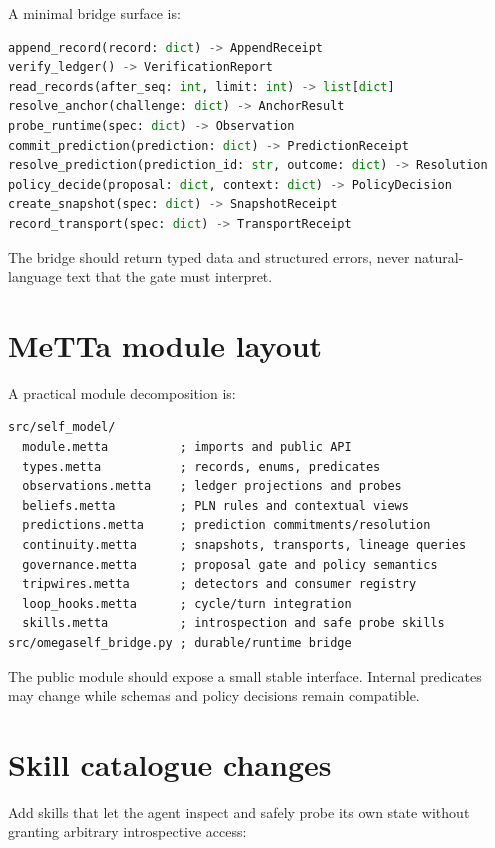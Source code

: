 \documentclass[11pt,oneside]{report}
\begin{document}
A minimal bridge surface is:

\begin{lstlisting}[language=Python,caption={Reference bridge interface}]
append_record(record: dict) -> AppendReceipt
verify_ledger() -> VerificationReport
read_records(after_seq: int, limit: int) -> list[dict]
resolve_anchor(challenge: dict) -> AnchorResult
probe_runtime(spec: dict) -> Observation
commit_prediction(prediction: dict) -> PredictionReceipt
resolve_prediction(prediction_id: str, outcome: dict) -> Resolution
policy_decide(proposal: dict, context: dict) -> PolicyDecision
create_snapshot(spec: dict) -> SnapshotReceipt
record_transport(spec: dict) -> TransportReceipt
\end{lstlisting}

The bridge should return typed data and structured errors, never natural-language text that the gate must interpret.

\section{MeTTa module layout}

A practical module decomposition is:

\begin{lstlisting}[caption={Suggested OmegaClaw module layout}]
src/self_model/
  module.metta          ; imports and public API
  types.metta           ; records, enums, predicates
  observations.metta    ; ledger projections and probes
  beliefs.metta         ; PLN rules and contextual views
  predictions.metta     ; prediction commitments/resolution
  continuity.metta      ; snapshots, transports, lineage queries
  governance.metta      ; proposal gate and policy semantics
  tripwires.metta       ; detectors and consumer registry
  loop_hooks.metta      ; cycle/turn integration
  skills.metta          ; introspection and safe probe skills
src/omegaself_bridge.py ; durable/runtime bridge
\end{lstlisting}

The public module should expose a small stable interface. Internal predicates may change while schemas and policy decisions remain compatible.

\section{Skill catalogue changes}

Add skills that let the agent inspect and safely probe its own state without granting arbitrary introspective access:
\end{document}
